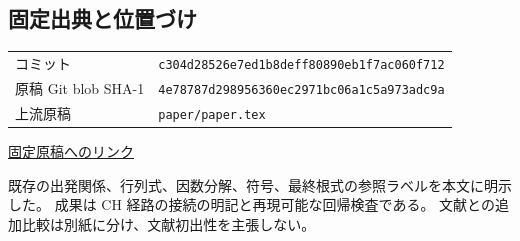\documentclass[11pt,a4paper]{article}
\begin{document}
\subsection*{固定出典と位置づけ}
\small
\noindent
\begin{tabular}{@{}ll@{}}
コミット & \texttt{c304d28526e7ed1b8deff80890eb1f7ac060f712}\\
原稿 Git blob SHA-1 & \texttt{4e78787d298956360ec2971bc06a1c5a973adc9a}\\
上流原稿 & \texttt{paper/paper.tex}
\end{tabular}\par
\noindent
\href{https://github.com/ryos-physrockme/dbi-stress-tensor-flow/blob/c304d28526e7ed1b8deff80890eb1f7ac060f712/paper/paper.tex}{固定原稿へのリンク}\par
既存の出発関係、行列式、因数分解、符号、最終根式の参照ラベルを本文に明示した。
成果は CH 経路の接続の明記と再現可能な回帰検査である。
文献との追加比較は別紙に分け、文献初出性を主張しない。
\end{document}
